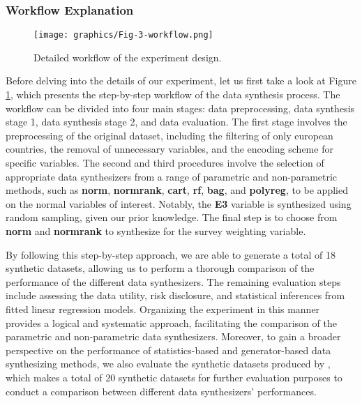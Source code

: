 \subsubsection{Workflow Explanation}
\label{subsubsec:workflow}

\begin{figure}[H]
    \centering
    \texttt{[image: graphics/Fig-3-workflow.png]}    
    \caption{Detailed workflow of the experiment design.}
    \label{fig:workflow}
\end{figure}
Before delving into the details of our experiment, let us first take a look at Figure \ref{fig:workflow}, which presents the step-by-step workflow of the data synthesis process. The workflow can be divided into four main stages: data preprocessing, data synthesis stage 1, data synthesis stage 2, and data evaluation. The first stage involves the preprocessing of the original dataset, including the filtering of only european countries, the removal of unnecessary variables, and the encoding scheme for specific variables. The second and third procedures involve the selection of appropriate data synthesizers from a range of parametric and non-parametric methods, such as \textbf{norm}, \textbf{normrank}, \textbf{cart}, \textbf{rf}, \textbf{bag}, and \textbf{polyreg}, to be applied on the normal variables of interest. Notably, the \textbf{E3} variable is synthesized using random sampling, given our prior knowledge. The final step is to choose from \textbf{norm} and \textbf{normrank} to synthesize for the survey weighting variable. 

By following this step-by-step approach, we are able to generate a total of 18 synthetic datasets, allowing us to perform a thorough comparison of the performance of the different data synthesizers. The remaining evaluation steps include assessing the data utility, risk disclosure, and statistical inferences from fitted linear regression models. Organizing the experiment in this manner provides a logical and systematic approach, facilitating the comparison of the parametric and non-parametric data synthesizers. Moreover, to gain a broader perspective on the performance of statistics-based and generator-based data synthesizing methods, we also evaluate the synthetic datasets produced by \citet{liu2021iterative}, which makes a total of 20 synthetic datasets for further evaluation purposes to conduct a comparison between different data synthesizers' performances.

